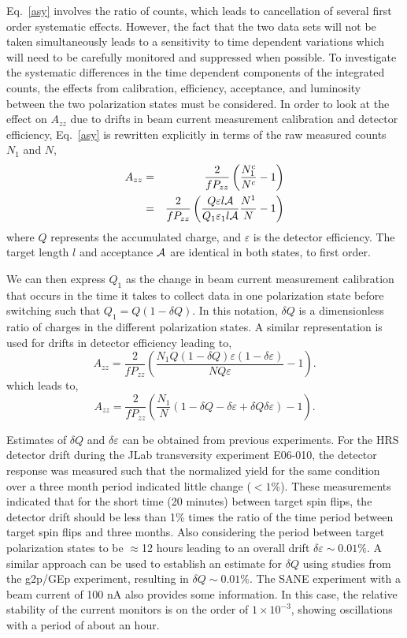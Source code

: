 Eq.~\ref{asy} involves the ratio of counts, which leads to cancellation of several first order systematic effects.  However, the fact that the two data sets will not be taken simultaneously leads to a sensitivity to time dependent variations which will need to be carefully monitored and suppressed when possible.  
%
To investigate the systematic differences in the time dependent components of the
integrated counts, the effects from calibration, efficiency, acceptance,
and luminosity between the two polarization states must be considered.
In order to look at the effect on $A_{zz}$ due to drifts in beam current measurement
calibration and detector efficiency, Eq.~\ref{asy} is rewritten explicitly in terms of the raw measured counts $N_1$ and $N$,
\begin{eqnarray} \label{3c}
\nonumber
A_{zz}&=&\frac{2}{fP_{zz}}\left(\frac{N^c_1}{N^c}-1\right) \\
      &=&\frac{2}{fP_{zz}}\left(\frac{Q\varepsilon l \cal{A}}{Q_1\varepsilon_1 l \cal{A}}\frac{N^1}{N}-1\right)
\end{eqnarray}
where $Q$ represents the accumulated charge, and $\varepsilon$ is the detector efficiency. The target length $l$  and acceptance $\cal{A}$ are identical in both states, to first order.

We can then express $Q_1$ as the change in beam current measurement calibration that occurs in
the time it takes to collect data in one polarization state before switching such that $Q_1=Q(1-\delta{Q})$.
In this notation, $\delta{Q}$ is a dimensionless ratio of charges in the different polarization states.  A similar representation
is used for drifts in detector efficiency leading to,
\begin{equation}
A_{zz}=\frac{2}{fP_{zz}}\left(\frac{N_1Q(1-\delta{Q})\varepsilon(1-\delta\varepsilon)}{NQ\varepsilon}-1\right).
\end{equation}
which leads to,
\begin{equation}
A_{zz}=\frac{2}{fP_{zz}}\left(\frac{N_1}{N}(1-\delta{Q}-\delta\varepsilon+\delta{Q}\delta\varepsilon)-1\right).
\end{equation}

Estimates of $\delta{Q}$ and $\delta\varepsilon$ can be obtained from previous experiments.
For the HRS detector drift during the JLab transversity experiment E06-010, the detector response
was measured such that the normalized yield for the same condition over a three month period indicated little change ($<1$\%).
These measurements indicated that for the short time (20 minutes) between target spin flips,
the detector drift should be less than 1\% times the ratio of the time period between target spin flips and three months.
Also considering the period between target polarization states to be
$\approx$12 hours leading to an overall drift $\delta\varepsilon\sim0.01\%$.  A similar approach can be used to establish an estimate
for $\delta{Q}$ using studies from the g2p/GEp experiment, resulting in $\delta{Q}\sim0.01\%$.  The SANE
experiment with a beam current of 100 nA also provides some information. In this case, the relative stability of the current
monitors is on the order of $1\times10^{-3}$, showing oscillations with a period of about an hour.

